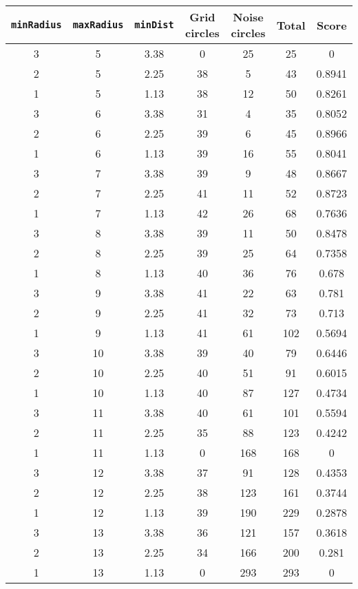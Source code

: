 \documentclass[letterpaper, 12pt]{article}
\begin{document}
\begin{longtable}{|c|c|c|c|c|c|c|}
\hline
\textbf{\texttt{minRadius}} & \textbf{\texttt{maxRadius}} & \textbf{\texttt{minDist}} & \textbf{Grid circles} & \textbf{Noise circles} & \textbf{Total} & \textbf{Score} \\
\hline
3 & 5 & 3.38 & 0 & 25 & 25 & 0 \\
\hline
2 & 5 & 2.25 & 38 & 5 & 43 & 0.8941 \\
\hline
1 & 5 & 1.13 & 38 & 12 & 50 & 0.8261 \\
\hline
3 & 6 & 3.38 & 31 & 4 & 35 & 0.8052 \\
\hline
2 & 6 & 2.25 & 39 & 6 & 45 & 0.8966 \\
\hline
1 & 6 & 1.13 & 39 & 16 & 55 & 0.8041 \\
\hline
3 & 7 & 3.38 & 39 & 9 & 48 & 0.8667 \\
\hline
2 & 7 & 2.25 & 41 & 11 & 52 & 0.8723 \\
\hline
1 & 7 & 1.13 & 42 & 26 & 68 & 0.7636 \\
\hline
3 & 8 & 3.38 & 39 & 11 & 50 & 0.8478 \\
\hline
2 & 8 & 2.25 & 39 & 25 & 64 & 0.7358 \\
\hline
1 & 8 & 1.13 & 40 & 36 & 76 & 0.678 \\
\hline
3 & 9 & 3.38 & 41 & 22 & 63 & 0.781 \\
\hline
2 & 9 & 2.25 & 41 & 32 & 73 & 0.713 \\
\hline
1 & 9 & 1.13 & 41 & 61 & 102 & 0.5694 \\
\hline
3 & 10 & 3.38 & 39 & 40 & 79 & 0.6446 \\
\hline
2 & 10 & 2.25 & 40 & 51 & 91 & 0.6015 \\
\hline
1 & 10 & 1.13 & 40 & 87 & 127 & 0.4734 \\
\hline
3 & 11 & 3.38 & 40 & 61 & 101 & 0.5594 \\
\hline
2 & 11 & 2.25 & 35 & 88 & 123 & 0.4242 \\
\hline
1 & 11 & 1.13 & 0 & 168 & 168 & 0 \\
\hline
3 & 12 & 3.38 & 37 & 91 & 128 & 0.4353 \\
\hline
2 & 12 & 2.25 & 38 & 123 & 161 & 0.3744 \\
\hline
1 & 12 & 1.13 & 39 & 190 & 229 & 0.2878 \\
\hline
3 & 13 & 3.38 & 36 & 121 & 157 & 0.3618 \\
\hline
2 & 13 & 2.25 & 34 & 166 & 200 & 0.281 \\
\hline
1 & 13 & 1.13 & 0 & 293 & 293 & 0 \\

\end{longtable}
\end{document}
